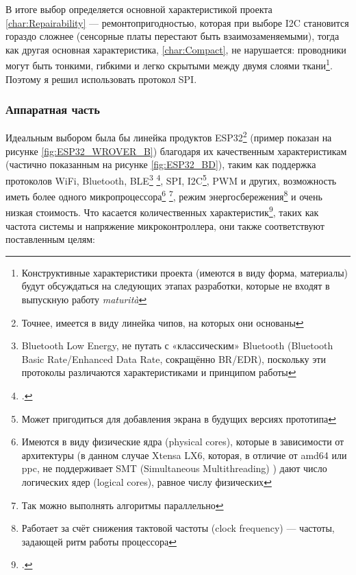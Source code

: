 \documentclass[a4paper, 10pt, final]{article} %
\newcommand{\parenciteit}[2]{\textit{\parencite[#1]{#2}}} %
\begin{document}
    \noindent В итоге выбор определяется основной характеристикой проекта \ref{char:Repairability} --- ремонтопригодностью, которая при выборе I2C становится гораздо сложнее (сенсорные платы перестают быть взаимозаменяемыми), тогда как другая основная характеристика, \ref{char:Compact}, не нарушается: проводники могут быть тонкими, гибкими и легко скрытыми между двумя слоями ткани\footnote{Конструктивные характеристики проекта (имеются в виду форма, материалы) будут обсуждаться на следующих этапах разработки, которые не входят в выпускную работу \emph{maturit\`{a}}}. Поэтому я решил использовать протокол SPI.

    \subsubsection{Аппаратная часть}\label{sec:MotherboardDesignHardware}
    Идеальным выбором была бы линейка продуктов ESP32\footnote{Точнее, имеется в виду линейка чипов, на которых они основаны} (пример показан на рисунке \ref{fig:ESP32_WROVER_B}) благодаря их качественным характеристикам (частично показанным на рисунке \ref{fig:ESP32_BD}), таким как поддержка протоколов WiFi, Bluetooth, BLE\footnote{Bluetooth Low Energy, не путать с «классическим» Bluetooth (Bluetooth Basic Rate/Enhanced Data Rate, сокращённо BR/EDR), поскольку эти протоколы различаются характеристиками и принципом работы} \footcite[]{BLE:Wiki}, SPI, I2C\footnote{Может пригодиться для добавления экрана в будущих версиях прототипа}, PWM и других, возможность иметь более одного микропроцессора\footnote{Имеются в виду физические ядра (physical cores), которые в зависимости от архитектуры (в данном случае Xtensa LX6, которая, в отличие от amd64 или ppc, не поддерживает SMT (Simultaneous Multithreading) \parenciteit{}{CPUSMT:Wiki}) дают число логических ядер (logical cores), равное числу физических} \footnote{Так можно выполнять алгоритмы параллельно}, режим энергосбережения\footnote{Работает за счёт снижения тактовой частоты (clock frequency) --- частоты, задающей ритм работы процессора} и очень низкая стоимость.
    Что касается количественных характеристик\footcite[]{ESP32:Datasheet}, таких как частота системы и напряжение микроконтроллера, они также соответствуют поставленным целям:
\end{document}
